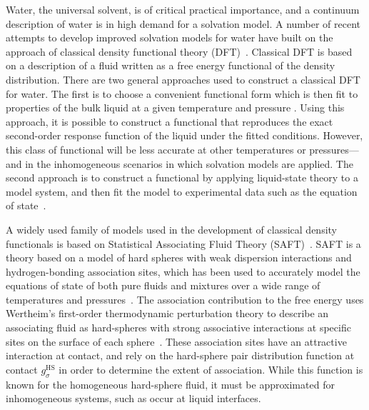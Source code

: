 Water, the universal solvent, is of critical practical importance, and
a continuum description of water is in high demand for a solvation
model.  A number of recent attempts to develop improved solvation
models for water have built on the approach of classical
density functional theory (DFT)~\cite{jeanmairet2013molecular,
  zhao2011molecular, zhao2011new, ramirez2005direct,
  ramirez2005density, levesque2012solvation, levesque2012scalar}.
Classical DFT is based on a description of a fluid written as a free
energy functional of the density distribution.  There are two general
approaches used to construct a classical DFT for water.  The first is
to choose a convenient functional form which is then fit to properties
of the bulk liquid at a given temperature and pressure
\cite{jeanmairet2013molecular, zhao2011molecular, zhao2011new,
  ramirez2005direct, ramirez2005density, levesque2012solvation,
  levesque2012scalar, lischner2010classical}.  Using this approach, it
is possible to construct a functional that reproduces the exact
second-order response function of the liquid under the fitted
conditions.  However, this class of functional will be less accurate
at other temperatures or pressures---and in the inhomogeneous
scenarios in which solvation models are applied.  The second approach
is to construct a functional by applying liquid-state theory to a
model system, and then fit the model to experimental data such as the
equation of state~\cite{hughes2013classical, clark2006developing,
  gloor2002saft, gloor2004accurate, gloor2007prediction, Jaqaman2004,
  chuev2006, fu2005vapor-liquid-dft,kiselev2006new,
  blas2001examination, sundararaman2012computationally}.

A widely used family of models used in the development of classical
density functionals is based on Statistical Associating Fluid Theory
(SAFT)~\cite{chapman1989saft}.  SAFT is a theory based on a model of
hard spheres with weak dispersion interactions and hydrogen-bonding
association sites, which has been used to accurately model the
equations of state of both pure fluids and mixtures over a wide range
of temperatures and pressures~\cite{muller2001molecular,
  tan2008recent}. The association contribution to the free energy uses
Wertheim's first-order thermodynamic perturbation theory to describe
an associating fluid as hard-spheres with strong associative
interactions at specific sites on the surface of each
sphere~\cite{wertheim1984fluidsI, wertheim1984fluidsII,
  wertheim1986fluidsIII, wertheim1986fluidsIV}.  These association
sites have an attractive interaction at contact, and rely on the
hard-sphere pair distribution function at contact $g_\sigma^\text{HS}$
in order to determine the extent of association.  While this function
is known for the homogeneous hard-sphere fluid, it must be
approximated for inhomogeneous systems, such as occur at liquid
interfaces.

